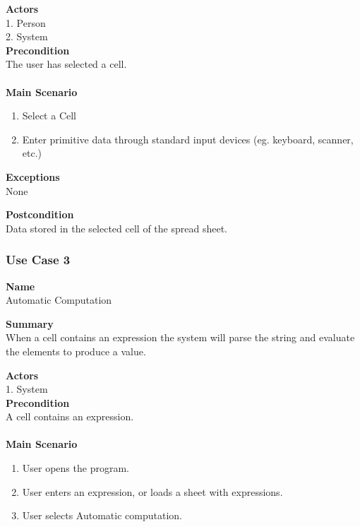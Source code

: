 \documentclass[12pt]{article}
\begin{document}
\noindent
{\bf Actors}\\
1. Person\\
2. System\\

\noindent
{\bf Precondition}\\
The user has selected a cell.\\
\noindent\\

{\bf Main Scenario}\\
\vspace*{-0.2in}
\begin{enumerate}
\item Select a Cell
\item Enter primitive data through standard input devices (eg. keyboard, scanner, etc.)
\end{enumerate}

\noindent
{\bf Exceptions}\\
None

\noindent
{\bf Postcondition}\\
Data stored in the selected cell of the spread sheet.

\clearpage

\subsubsection{Use Case 3} \label{uc:3}

\noindent
{\bf Name}\\
Automatic Computation

\noindent
{\bf Summary}\\
When a cell contains an expression the system will parse the string and evaluate the elements to produce a value.

\noindent
{\bf Actors}\\
1. System\\

\noindent
{\bf Precondition}\\
A cell contains an expression.\\
\noindent\\
{\bf Main Scenario}\\
\vspace*{-0.2in}
\begin{enumerate}
\item User opens the program.
\item User enters an expression, or loads a sheet with expressions.
\item User selects Automatic computation.
\end{enumerate}
\end{document}
